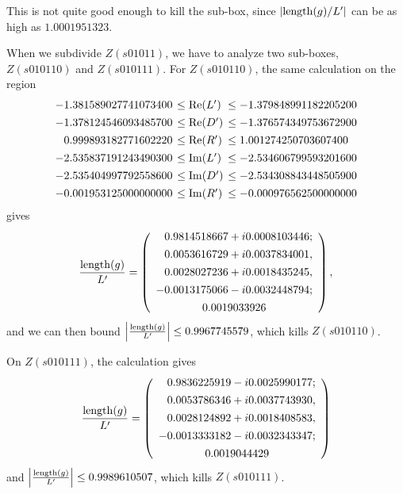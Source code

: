 This is not quite good enough to kill the sub-box, since
$|{\rm length}(g)/L'|$ can be as high as $1.0001951323$.

When we subdivide $Z(s01011)$, we have to analyze two sub-boxes,
$Z(s010110)$ and $Z(s010111)$.
For $Z(s010110)$, the same calculation on the region
$$\begin{array}{rll}
-1.381589027741073400 &\hskip-6pt \leq {\rm Re}(L') &\hskip-6pt\leq -1.379848991182205200\\[4pt]
-1.378124546093485700 &\hskip-6pt\leq {\rm Re}(D')
&\hskip-6pt\leq -1.376574349753672900\\[4pt]
0.999893182771602220 &\hskip-6pt\leq {\rm Re}(R')&\hskip-6pt \leq 1.001274250703607400\\[4pt]
-2.535837191243490300&\hskip-6pt \leq {\rm Im}(L')&\hskip-6pt \leq
-2.534606799593201600\\[4pt]
-2.535404997792558600 &\hskip-6pt\leq {\rm Im}(D') &\hskip-6pt\leq -2.534308843448505900\\[4pt]
-0.001953125000000000&\hskip-6pt \leq {\rm Im}(R')
&\hskip-6pt\leq -0.000976562500000000
\end{array} 
$$
gives 
$$
{{\rm length}(g) \over L'} = 
  \left(\begin{array}{c}
 \phantom{-}   0.9814518667 + i 0.0008103446;\\[4pt]
\phantom{-}      0.0053616729 + i 0.0037834001,\\[4pt]
  \phantom{-}    0.0028027236 + i 0.0018435245,\\[4pt]
    -0.0013175066 - i 0.0032448794;\\[4pt]
    0.0019033926
  \end{array}\right),
$$
and we can then bound $\left|{{\rm length}(g) \over L'}\right| \leq 0.9967745579$,
which kills $Z(s010110)$.  

On $Z(s010111)$, the calculation gives
$$
{{\rm length}(g) \over L'} =
  \left(\begin{array}{c}
\phantom{-}      0.9836225919 - i 0.0025990177;\\[4pt]
  \phantom{-}    0.0053786346 + i 0.0037743930,\\[4pt]
 \phantom{-}     0.0028124892 + i 0.0018408583,\\[4pt]
    -0.0013333182 - i 0.0032343347;\\[4pt]
    0.0019044429
  \end{array}\right)
$$
and $\left|{{\rm length}(g) \over L'}\right| \leq 0.9989610507$,
which kills $Z(s010111)$.

 